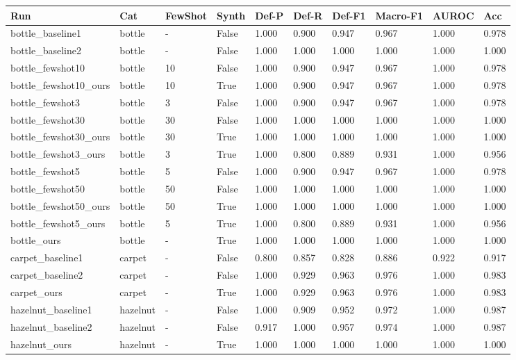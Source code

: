 \begin{tabular}{llllllllll}
\toprule
Run & Cat & FewShot & Synth & Def-P & Def-R & Def-F1 & Macro-F1 & AUROC & Acc \\
\midrule
bottle_baseline1 & bottle & - & False & 1.000 & 0.900 & 0.947 & 0.967 & 1.000 & 0.978 \\
bottle_baseline2 & bottle & - & False & 1.000 & 1.000 & 1.000 & 1.000 & 1.000 & 1.000 \\
bottle_fewshot10 & bottle & 10 & False & 1.000 & 0.900 & 0.947 & 0.967 & 1.000 & 0.978 \\
bottle_fewshot10_ours & bottle & 10 & True & 1.000 & 0.900 & 0.947 & 0.967 & 1.000 & 0.978 \\
bottle_fewshot3 & bottle & 3 & False & 1.000 & 0.900 & 0.947 & 0.967 & 1.000 & 0.978 \\
bottle_fewshot30 & bottle & 30 & False & 1.000 & 1.000 & 1.000 & 1.000 & 1.000 & 1.000 \\
bottle_fewshot30_ours & bottle & 30 & True & 1.000 & 1.000 & 1.000 & 1.000 & 1.000 & 1.000 \\
bottle_fewshot3_ours & bottle & 3 & True & 1.000 & 0.800 & 0.889 & 0.931 & 1.000 & 0.956 \\
bottle_fewshot5 & bottle & 5 & False & 1.000 & 0.900 & 0.947 & 0.967 & 1.000 & 0.978 \\
bottle_fewshot50 & bottle & 50 & False & 1.000 & 1.000 & 1.000 & 1.000 & 1.000 & 1.000 \\
bottle_fewshot50_ours & bottle & 50 & True & 1.000 & 1.000 & 1.000 & 1.000 & 1.000 & 1.000 \\
bottle_fewshot5_ours & bottle & 5 & True & 1.000 & 0.800 & 0.889 & 0.931 & 1.000 & 0.956 \\
bottle_ours & bottle & - & True & 1.000 & 1.000 & 1.000 & 1.000 & 1.000 & 1.000 \\
carpet_baseline1 & carpet & - & False & 0.800 & 0.857 & 0.828 & 0.886 & 0.922 & 0.917 \\
carpet_baseline2 & carpet & - & False & 1.000 & 0.929 & 0.963 & 0.976 & 1.000 & 0.983 \\
carpet_ours & carpet & - & True & 1.000 & 0.929 & 0.963 & 0.976 & 1.000 & 0.983 \\
hazelnut_baseline1 & hazelnut & - & False & 1.000 & 0.909 & 0.952 & 0.972 & 1.000 & 0.987 \\
hazelnut_baseline2 & hazelnut & - & False & 0.917 & 1.000 & 0.957 & 0.974 & 1.000 & 0.987 \\
hazelnut_ours & hazelnut & - & True & 1.000 & 1.000 & 1.000 & 1.000 & 1.000 & 1.000 \\
\bottomrule
\end{tabular}
